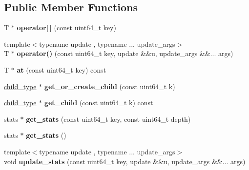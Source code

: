 \subsection*{Public Member Functions}
\begin{DoxyCompactItemize}
\item 
\mbox{\label{classdialog_1_1index_1_1tiered__index_ab909933b66402ddec5491ca0f6ac28df}} 
T $\ast$ {\bfseries operator\mbox{[}$\,$\mbox{]}} (const uint64\+\_\+t key)
\item 
\mbox{\label{classdialog_1_1index_1_1tiered__index_a6aa03fb0e9279385b591f0d7955436ac}} 
{\footnotesize template$<$typename update , typename ... update\+\_\+args$>$ }\\T $\ast$ {\bfseries operator()} (const uint64\+\_\+t key, update \&\&u, update\+\_\+args \&\&... args)
\item 
\mbox{\label{classdialog_1_1index_1_1tiered__index_a66697fc228452ff109c93903b9f7a6f6}} 
T $\ast$ {\bfseries at} (const uint64\+\_\+t key) const
\item 
\mbox{\label{classdialog_1_1index_1_1tiered__index_a39be7166eb13bbaaf053ac4977f10d02}} 
\hyperlink{classdialog_1_1index_1_1tiered__index}{child\+\_\+type} $\ast$ {\bfseries get\+\_\+or\+\_\+create\+\_\+child} (const uint64\+\_\+t k)
\item 
\mbox{\label{classdialog_1_1index_1_1tiered__index_a8ed6927b1a06398a5af533531f460048}} 
\hyperlink{classdialog_1_1index_1_1tiered__index}{child\+\_\+type} $\ast$ {\bfseries get\+\_\+child} (const uint64\+\_\+t k) const
\item 
\mbox{\label{classdialog_1_1index_1_1tiered__index_af308248d15efc5ce3edc888adfd6e389}} 
stats $\ast$ {\bfseries get\+\_\+stats} (const uint64\+\_\+t key, const uint64\+\_\+t depth)
\item 
\mbox{\label{classdialog_1_1index_1_1tiered__index_ae89ab8dc5e28975b15419d352f239cb8}} 
stats $\ast$ {\bfseries get\+\_\+stats} ()
\item 
\mbox{\label{classdialog_1_1index_1_1tiered__index_ae1764ad9f03dc9d5fd608e7c3d327b1a}} 
{\footnotesize template$<$typename update , typename ... update\+\_\+args$>$ }\\void {\bfseries update\+\_\+stats} (const uint64\+\_\+t key, update \&\&u, update\+\_\+args \&\&... args)
\end{DoxyCompactItemize}
